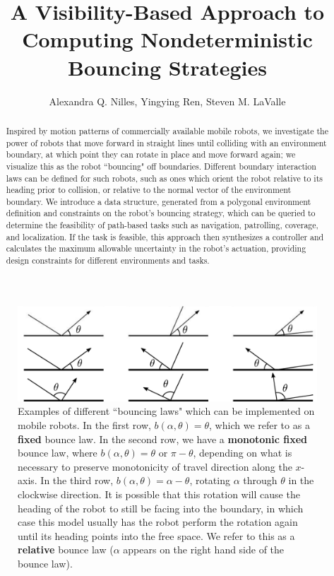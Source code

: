 \documentclass[]{styles/svproc}  %
\title{A Visibility-Based Approach to Computing Nondeterministic Bouncing
Strategies}
\author{Alexandra Q. Nilles, Yingying Ren, Steven M. LaValle%
}
\begin{document}
\maketitle

\begin{abstract}
Inspired by motion patterns of commercially available mobile robots, we investigate the power of robots that 
move forward in straight lines
until colliding with an environment boundary, at which point they can rotate in
place and move forward again; we visualize this as the robot ``bouncing" off
boundaries. Different boundary interaction laws can be
defined for such robots, such as ones which orient the robot relative to its
heading prior to collision, or relative to the normal vector of the environment
boundary. We introduce a data structure, generated from a polygonal environment
 definition and constraints on the robot's bouncing strategy, which can be
queried to determine the feasibility of path-based tasks such as navigation,
patrolling, coverage, and localization. If the task is feasible, this
approach then synthesizes a controller and calculates the maximum allowable 
uncertainty in the robot's actuation, providing design constraints for different 
environments and tasks.
\end{abstract}

\begin{figure}
    \includegraphics[width=0.8\linewidth]{figures/bounce_examples.pdf}
    \centering
    \caption[test]{\label{fig:bex}Examples of different ``bouncing laws" which can be implemented on
mobile robots. In the first row, $b(\alpha, \theta) = \theta$, which we refer to
as a \textbf{fixed} bounce law. In the second row, we have a \textbf{monotonic
fixed} bounce law, where
$b(\alpha, \theta) = \theta$ or $\pi-\theta$, depending on what is necessary to
preserve monotonicity of travel direction along the $x$-axis. In the third
row, $b(\alpha, \theta) = \alpha - \theta$, rotating $\alpha$ through $\theta$ in the clockwise
direction. It is possible that this rotation will cause the 
heading of the robot to still be facing into the boundary, in which case this model usually has the robot 
perform the rotation again until its heading points into the free space. We
refer to this as a \textbf{relative} bounce law ($\alpha$ appears on the
right hand side of the bounce law).
}
\end{figure}
\end{document}
